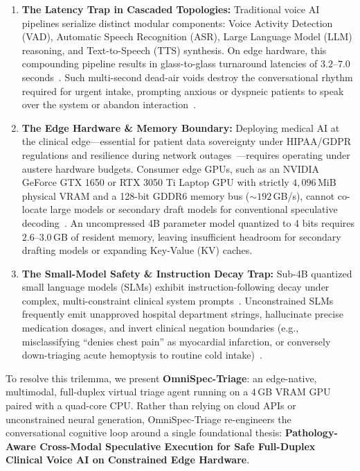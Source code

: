 \documentclass[10pt,journal,compsoc]{IEEEtran}
\begin{document}
\begin{enumerate}
    \item \textbf{The Latency Trap in Cascaded Topologies:} Traditional voice AI pipelines serialize distinct modular components: Voice Activity Detection (VAD), Automatic Speech Recognition (ASR), Large Language Model (LLM) reasoning, and Text-to-Speech (TTS) synthesis. On edge hardware, this compounding pipeline results in glass-to-glass turnaround latencies of $3.2$--$7.0$\,seconds~\cite{miniomni2024}. Such multi-second dead-air voids destroy the conversational rhythm required for urgent intake, prompting anxious or dyspneic patients to speak over the system or abandon interaction~\cite{moshi2024}.
    \item \textbf{The Edge Hardware \& Memory Boundary:} Deploying medical AI at the clinical edge---essential for patient data sovereignty under HIPAA/GDPR regulations and resilience during network outages~\cite{asplos2025npu,acl2025slm}---requires operating under austere hardware budgets. Consumer edge GPUs, such as an NVIDIA GeForce GTX 1650 or RTX 3050 Ti Laptop GPU with strictly $4{,}096$\,MiB physical VRAM and a 128-bit GDDR6 memory bus ($\sim 192$\,GB/s), cannot co-locate large models or secondary draft models for conventional speculative decoding~\cite{deepseek2024v3}. An uncompressed 4B parameter model quantized to 4 bits requires $2.6$--$3.0$\,GB of resident memory, leaving insufficient headroom for secondary drafting models or expanding Key-Value (KV) caches.
    \item \textbf{The Small-Model Safety \& Instruction Decay Trap:} Sub-4B quantized small language models (SLMs) exhibit instruction-following decay under complex, multi-constraint clinical system prompts~\cite{singhal2023medpalm2}. Unconstrained SLMs frequently emit unapproved hospital department strings, hallucinate precise medication dosages, and invert clinical negation boundaries (e.g., misclassifying ``denies chest pain'' as myocardial infarction, or conversely down-triaging acute hemoptysis to routine cold intake)~\cite{geng2023gcd}.
\end{enumerate}

To resolve this trilemma, we present \textbf{OmniSpec-Triage}: an edge-native, multimodal, full-duplex virtual triage agent running on a $4$\,GB VRAM GPU paired with a quad-core CPU. Rather than relying on cloud APIs or unconstrained neural generation, OmniSpec-Triage re-engineers the conversational cognitive loop around a single
foundational thesis: \textbf{Pathology-Aware Cross-Modal Speculative Execution for Safe Full-Duplex Clinical Voice AI on Constrained Edge Hardware}.
\end{document}
